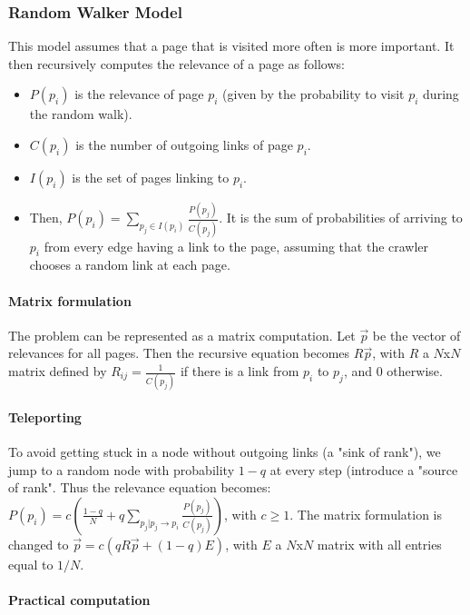\subsubsection{Random Walker Model}

This model assumes that a page that is visited more often is more important. It then recursively computes the relevance of a page as follows:
\begin{itemize}
\item $P(p_i)$ is the relevance of page $p_i$ (given by the probability to visit $p_i$ during the random walk).
\item $C(p_i)$ is the number of outgoing links of page $p_i$.
\item $I(p_i)$ is the set of pages linking to $p_i$.
\item Then, $P(p_i) = \sum_{p_j \in I(p_i)} \frac{P(p_j)}{C(p_j)}$. It is the sum of probabilities of arriving to $p_i$ from every edge having a link to the page, assuming that the crawler chooses a random link at each page.
\end{itemize}

\paragraph{Matrix formulation}

The problem can be represented as a matrix computation. Let $\vec{p}$ be the vector of relevances for all pages. Then the recursive equation becomes $R\vec{p}$, with $R$ a $N$x$N$ matrix defined by $R_{ij} = \frac{1}{C(p_j)}$ if there is a link from $p_i$ to $p_j$, and $0$ otherwise.

\paragraph{Teleporting}

To avoid getting stuck in a node without outgoing links (a "sink of rank"), we jump to a random node with probability $1-q$ at every step (introduce a "source of rank". Thus the relevance equation becomes:
$P(p_i) = c(\frac{1-q}{N} + q \sum_{p_j|p_j \rightarrow p_i} \frac{P(p_j)}{C(p_j)})$, with $c \geq 1$.
The matrix formulation is changed to $\vec{p} = c(qR\vec{p} + (1-q)E)$, with $E$ a $N$x$N$ matrix with all entries equal to $1/N$.

\paragraph{Practical computation}

